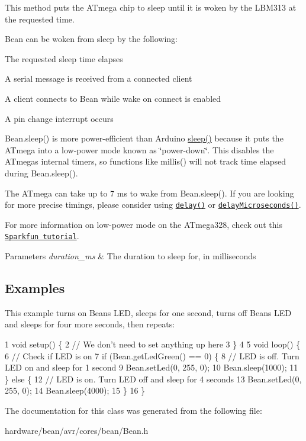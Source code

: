 This method puts the A\+Tmega chip to sleep until it is woken by the L\+B\+M313 at the requested time.

Bean can be woken from sleep by the following\+:


\begin{DoxyItemize}
\item The requested sleep time elapses
\item A serial message is received from a connected client
\item A client connects to Bean while wake on connect is enabled
\item A pin change interrupt occurs
\end{DoxyItemize}

{\ttfamily Bean.\+sleep()} is more power-\/efficient than Arduino {\ttfamily \hyperlink{class_bean_class_a15d6716d0bdc66a0345acc29d0c14a14}{sleep()}} because it puts the A\+Tmega into a low-\/power mode known as \char`\"{}power-\/down\char`\"{}. This disables the A\+Tmega\textquotesingle{}s internal timers, so functions like {\ttfamily millis()} will not track time elapsed during {\ttfamily Bean.\+sleep()}.

The A\+Tmega can take up to 7 ms to wake from {\ttfamily Bean.\+sleep()}. If you are looking for more precise timings, please consider using \href{https://www.arduino.cc/en/Reference/Delay}{\tt delay()} or \href{https://www.arduino.cc/en/Reference/DelayMicroseconds}{\tt delay\+Microseconds()}.

For more information on low-\/power mode on the A\+Tmega328, check out this \href{https://www.sparkfun.com/tutorials/309}{\tt Sparkfun tutorial}.


\begin{DoxyParams}{Parameters}
{\em duration\+\_\+ms} & The duration to sleep for, in milliseconds\\
\hline
\end{DoxyParams}
\subsection*{Examples}

This example turns on Bean\textquotesingle{}s L\+E\+D, sleeps for one second, turns off Bean\textquotesingle{}s L\+E\+D and sleeps for four more seconds, then repeats\+:


\begin{DoxyCodeInclude}
1 void setup() \{
2   // We don't need to set anything up here
3 \}
4 
5 void loop() \{
6   // Check if LED is on
7   if (Bean.getLedGreen() == 0) \{
8     // LED is off. Turn LED on and sleep for 1 second
9     Bean.setLed(0, 255, 0);
10     Bean.sleep(1000);
11   \} else \{
12     // LED is on. Turn LED off and sleep for 4 seconds
13     Bean.setLed(0, 255, 0);
14     Bean.sleep(4000);
15   \}
16 \}
\end{DoxyCodeInclude}
 

The documentation for this class was generated from the following file\+:\begin{DoxyCompactItemize}
\item 
hardware/bean/avr/cores/bean/Bean.\+h\end{DoxyCompactItemize}
